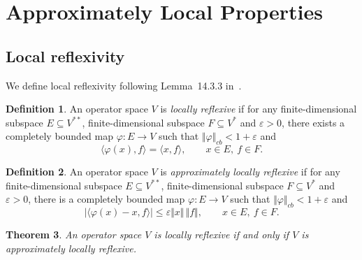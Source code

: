 \documentclass[12pt]{article}
\newtheorem{theorem}{Theorem}[section]
\theoremstyle{definition}
\newtheorem{definition}[theorem]{Definition}
\theoremstyle{remark}
\begin{document}
\section{Approximately Local Properties}
\subsection{Local reflexivity}\label{sec:local-reflexivity}

We define  local reflexivity following Lemma~14.3.3 in~\cite{ER00}.

\begin{definition}\label{def:local-reflexivity}
An operator space $V$ is \emph{locally reflexive} if for any
finite-dimensional subspace $E\subseteq V^{**}$,  finite-dimensional
subspace $F\subseteq V^*$ and $\varepsilon>0$, there exists a
completely bounded map $\varphi:E\to V$ such that $\Vert\varphi\Vert_{cb}<1+\varepsilon$
and
\[
\langle \varphi(x),f\rangle=\langle x,f\rangle,\qquad x\in E,\ f\in F.
\]
\end{definition}

\begin{definition}\label{def:approx-local-reflexivity}
An operator space $V$ is \emph{approximately locally reflexive} if for
any finite-dimensional subspace $E\subseteq V^{**}$, 
finite-dimensional subspace $F\subseteq V^*$ and $\varepsilon>0$,
there is a completely bounded map $\varphi:E\to V$ such that
$\Vert \varphi\Vert_{cb}<1+\varepsilon$ and
\[
|\langle \varphi(x)-x,f\rangle|
\le \varepsilon\Vert x\Vert\,\Vert f\Vert,
\qquad x\in E,\ f\in F.
\]
\end{definition}

\begin{theorem}\label{thm:approx-local-reflexivity}
An operator space $V$ is locally reflexive if and only if $V$ is
approximately locally reflexive.
\end{theorem}
\end{document}

